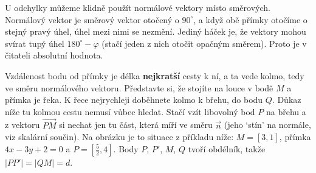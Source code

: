 \begin{center}
\end{center}

U odchylky můžeme klidně použít normálové vektory místo směrových. Normálový vektor je směrový vektor otočený o $90^\circ$, a když obě přímky otočíme o stejný pravý úhel, úhel mezi nimi se nezmění. Jediný háček je, že vektory mohou svírat tupý úhel $180^\circ - \varphi$ (stačí jeden z nich otočit opačným směrem). Proto je v čitateli absolutní hodnota.

\begin{center}
\end{center}

Vzdálenost bodu od přímky je délka \textbf{nejkratší} cesty k ní, a ta vede kolmo, tedy ve směru normálového vektoru. Představte si, že stojíte na louce v bodě $M$ a přímka je řeka. K řece nejrychleji doběhnete kolmo k břehu, do bodu $Q$. Důkaz níže tu kolmou cestu nemusí vůbec hledat. Stačí vzít libovolný bod $P$ na břehu a z vektoru $\overrightarrow{PM}$ si nechat jen tu část, která míří ve směru $\vec{n}$ (jeho `stín' na normále, viz skalární součin). Na obrázku je to situace z příkladu níže: $M = [3, 1]$, přímka $4x - 3y + 2 = 0$ a $P = \left[\frac{5}{2}, 4\right]$. Body $P$, $P'$, $M$, $Q$ tvoří obdélník, takže $|PP'| = |QM| = d$.

